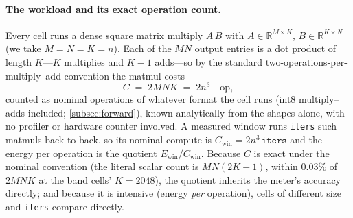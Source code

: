 \documentclass{article}
\theoremstyle{plain}
\theoremstyle{definition}
\theoremstyle{remark}
\begin{document}
\paragraph{The workload and its exact operation count.}
Every cell runs a dense square matrix multiply $A\,B$ with
$A\in\mathbb{R}^{M\times K}$, $B\in\mathbb{R}^{K\times N}$ (we take
$M=N=K=n$). Each of the $MN$ output entries is a dot product of length
$K$---$K$ multiplies and $K{-}1$ adds---so by the standard
two-operations-per-multiply--add convention the matmul costs
\begin{equation}
	C \;=\; 2MNK \;=\; 2n^3 \quad \text{op},
	\label{eq:flopcount}
\end{equation}
counted as nominal operations of whatever format the cell runs (int8
multiply--adds included; \cref{subsec:forward}),
known analytically from the shapes alone, with no profiler or
hardware counter involved. A measured window runs \texttt{iters} such
matmuls back to back, so its nominal compute is
$C_{\mathrm{win}} = 2n^3\,\texttt{iters}$ and the energy per operation is
the quotient $E_{\mathrm{win}} / C_{\mathrm{win}}$. Because $C$ is exact under the
nominal convention (the literal scalar count is $MN(2K-1)$, within
$0.03\%$ of $2MNK$ at the band cells' $K = 2048$), the quotient
inherits the meter's accuracy directly; and because it is intensive
(energy \emph{per} operation), cells of different size and \texttt{iters}
compare directly.
\end{document}

